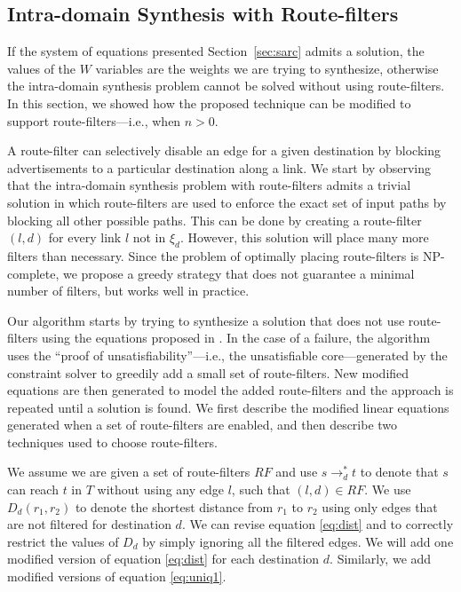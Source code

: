 \subsection{Intra-domain Synthesis with Route-filters} \label{sec:routefilter}

If the system of equations presented Section~\ref{sec:sarc} admits a solution, 
the values of the $W$ variables are the weights we are trying to synthesize,
otherwise the intra-domain synthesis problem cannot be solved without using route-filters.
In this section, we showed how the proposed technique can be modified
to support route-filters---i.e., when $n>0$.

A route-filter  can selectively disable an
edge for a given destination by  blocking advertisements to a
particular destination along a link.
We start by observing that the intra-domain synthesis problem with route-filters
admits a trivial solution in which 
route-filters are used to enforce the exact set of input paths by blocking all other possible paths.
This can be done by creating a 
route-filter $(l,d)$ for every link $l$ not in $\xi_d$. 
However, this solution will place many more filters than necessary.
Since the problem of optimally placing route-filters is NP-complete, 
we propose a greedy strategy that does not guarantee a minimal number of filters, but works well in practice.


Our algorithm starts by trying to synthesize a solution
that does not use route-filters using the equations proposed in . 
In the case of a failure, the algorithm uses the ``proof of unsatisfiability''---i.e., the unsatisfiable core---generated by 
the constraint solver 
to greedily add a small set of route-filters. 
New modified equations are then generated to model the added route-filters and the approach is repeated until a solution is found.
We first describe the 
modified linear equations generated when a set of
route-filters are enabled, and then describe two
techniques used to choose route-filters. 

We assume we are given a set of route-filters $RF$ and 
use $s\rightarrow_d^* t$ to denote that $s$ can reach $t$
in $T$ without using any edge $l$, such that $(l,d)\in RF$.
We use $D_d(r_1, r_2)$ to denote the shortest distance from $r_1$ to $r_2$
using only edges that are not filtered for destination $d$.
We can revise equation \eqref{eq:dist} and   to correctly restrict the values of $D_d$
by simply ignoring all the filtered edges. 
We will add one modified version of equation \eqref{eq:dist} for each destination $d$.
Similarly, we add modified versions of equation  \eqref{eq:uniq1}.

